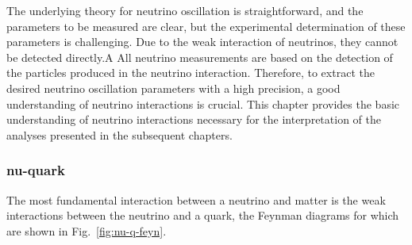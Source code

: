 The underlying theory for neutrino oscillation is straightforward, and the parameters to be measured are clear, but the experimental determination of these parameters is challenging.
Due to the weak interaction of neutrinos, they cannot be detected directly.A
All neutrino measurements are based on the detection of the particles produced in the neutrino interaction.
Therefore, to extract the desired neutrino oscillation parameters with a high precision, a good understanding of neutrino interactions is crucial.
This chapter provides the basic understanding of neutrino interactions necessary for the interpretation of the analyses presented in the subsequent chapters.

\subsubsection{nu-quark}
The most fundamental interaction between a neutrino and matter is the weak interactions between the neutrino and a quark, the Feynman diagrams for which are shown in Fig.~\ref{fig:nu-q-feyn}.

